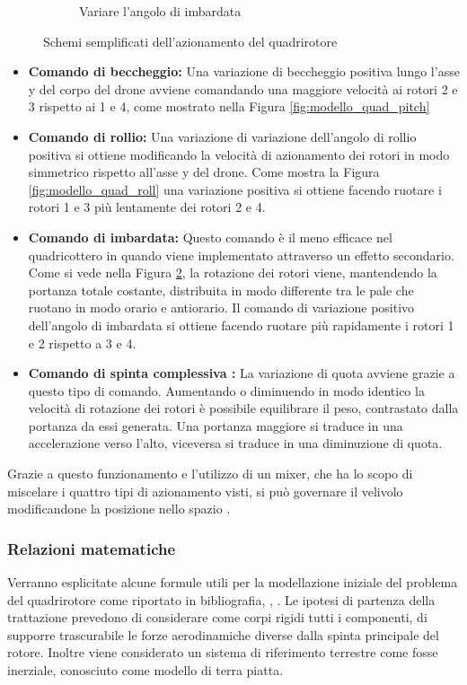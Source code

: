 \begin{figure}
\begin{subfigure}{0.45\textwidth}
		\caption{Variare l'angolo di imbardata}
		\label{fig:modello_quad_yaw}
	\end{subfigure}
	\caption{Schemi semplificati dell'azionamento del quadrirotore}
\end{figure}
\begin{itemize}
	\item \textbf{Comando di beccheggio:} Una variazione di beccheggio positiva lungo l'asse y del corpo del drone avviene comandando una maggiore velocità ai rotori 2 e 3 rispetto ai 1 e 4, come mostrato nella Figura \ref{fig:modello_quad_pitch}
	\item \textbf{Comando di rollio:} Una variazione di variazione dell'angolo di rollio positiva si ottiene modificando la velocità di azionamento dei rotori in modo simmetrico rispetto all'asse y del drone. Come mostra la Figura \ref{fig:modello_quad_roll} una variazione positiva si ottiene facendo ruotare i rotori 1 e 3 più lentamente dei rotori 2 e 4.
	\item \textbf{Comando di imbardata:} Questo comando è il meno efficace nel quadricottero in quando viene implementato attraverso un effetto secondario. Come si vede nella Figura \ref{fig:modello_quad_yaw}, la rotazione dei rotori viene, mantendendo la portanza totale costante, distribuita in modo differente tra le pale che ruotano in modo orario e antiorario. Il comando di variazione positivo dell'angolo di imbardata si ottiene facendo ruotare più rapidamente i rotori 1 e 2 rispetto a 3 e 4.
	\item \textbf{Comando di spinta complessiva : } La variazione di quota avviene grazie a questo tipo di comando. Aumentando o diminuendo in modo identico la velocità di rotazione dei rotori è possibile equilibrare il peso, contrastato dalla portanza da essi generata. Una portanza maggiore si traduce in una accelerazione verso l'alto, viceversa si traduce in una diminuzione di quota.
\end{itemize}
Grazie a questo funzionamento e l'utilizzo di un mixer, che ha lo scopo di miscelare i quattro tipi di azionamento visti, si può governare il velivolo modificandone la posizione nello spazio \cite{DesTestCarm}.
\subsubsection{Relazioni matematiche}
Verranno esplicitate alcune formule utili per la modellazione iniziale del problema del quadrirotore come riportato in bibliografia, \cite{DesTestCarm}, \cite{baseTesi}. Le ipotesi di partenza della trattazione prevedono di considerare come corpi rigidi tutti i componenti, di supporre trascurabile le forze aerodinamiche diverse dalla spinta principale del rotore. Inoltre viene considerato un sistema di riferimento terrestre come fosse inerziale, conosciuto come modello di terra piatta.

